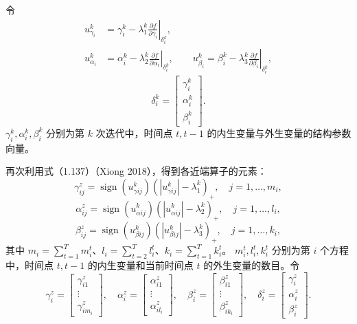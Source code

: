 令
\[
\begin{aligned}
u_{\gamma_i}^k&=\gamma_i^k-\lambda_1^k\left.\frac{\partial f}{\partial\gamma_i}\right|_{\delta_i^k},\\
u_{\alpha_i}^k&=\alpha_i^k-\lambda_2^k\left.\frac{\partial f}{\partial\alpha_i}\right|_{\delta_i^k},\qquad
u_{\beta_i}^k=\beta_i^k-\lambda_3^k\left.\frac{\partial f}{\partial\beta_i}\right|_{\delta_i^k},
\end{aligned}
\]
\[
\delta_i^k=\begin{bmatrix}\gamma_i^k\\\alpha_i^k\\\beta_i^k\end{bmatrix}.
\]
$\gamma_i^k,\alpha_i^k,\beta_i^k$ 分别为第 $k$ 次迭代中，时间点 $t,t-1$ 的内生变量与外生变量的结构参数向量。

再次利用式（1.137）（Xiong 2018），得到各近端算子的元素：
\begin{equation}
\gamma_{ij}^z=\operatorname{sign}(u_{\gamma ij}^k)(|u_{\gamma ij}^k|-\lambda_1^k)_+,
\quad j=1,\ldots,m_i,\tag{4.H.6}
\end{equation}
\begin{equation}
\alpha_{ij}^z=\operatorname{sign}(u_{\alpha ij}^k)(|u_{\alpha ij}^k|-\lambda_2^k)_+,
\quad j=1,\ldots,l_i,\tag{4.H.7}
\end{equation}
\begin{equation}
\beta_{ij}^z=\operatorname{sign}(u_{\beta ij}^k)(|u_{\beta ij}^k|-\lambda_3^k)_+,
\quad j=1,\ldots,k_i,\tag{4.H.8}
\end{equation}
其中 $m_i=\sum_{t=1}^{T}m_i^t$、$l_i=\sum_{t=2}^{T}l_i^t$、$k_i=\sum_{t=1}^{T}k_i^t$。
$m_i^t,l_i^t,k_i^t$ 分别为第 $i$ 个方程中，时间点 $t,t-1$ 的内生变量和当前时间点 $t$ 的外生变量的数目。令
\[
\gamma_i^z=\begin{bmatrix}\gamma_{i1}^z\\\vdots\\\gamma_{im_i}^z\end{bmatrix},\quad
\alpha_i^z=\begin{bmatrix}\alpha_{i1}^z\\\vdots\\\alpha_{il_i}^z\end{bmatrix},\quad
\beta_i^z=\begin{bmatrix}\beta_{i1}^z\\\vdots\\\beta_{ik_i}^z\end{bmatrix},\quad
\delta_i^z=\begin{bmatrix}\gamma_i^z\\\alpha_i^z\\\beta_i^z\end{bmatrix}.
\]
